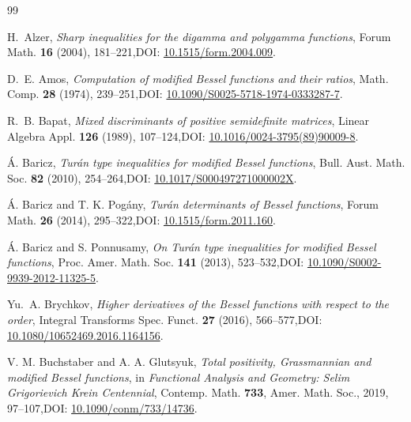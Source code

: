 \documentclass[11pt,a4paper]{amsart}
\numberwithin{equation}{section}
\theoremstyle{plain}
\theoremstyle{definition}
\begin{document}
\begin{thebibliography}{99}

H.~Alzer,
\emph{Sharp inequalities for the digamma and polygamma functions},
Forum Math. \textbf{16} (2004), 181--221,\newline DOI: \href{https://doi.org/10.1515/form.2004.009}{10.1515/form.2004.009}.

D.~E. Amos,
\emph{Computation of modified Bessel functions and their ratios},
Math. Comp. \textbf{28} (1974), 239--251,\newline DOI: \href{https://doi.org/10.1090/S0025-5718-1974-0333287-7}{10.1090/S0025-5718-1974-0333287-7}.


R.~B. Bapat,
\emph{Mixed discriminants of positive semidefinite matrices},
Linear Algebra Appl. \textbf{126} (1989), 107--124,\newline DOI: \href{https://doi.org/10.1016/0024-3795(89)90009-8}{10.1016/0024-3795(89)90009-8}.

\'{A}. Baricz,
\emph{Tur\'{a}n type inequalities for modified Bessel functions},
Bull. Aust. Math. Soc. \textbf{82} (2010), 254--264,\newline DOI: \href{https://doi.org/10.1017/S000497271000002X}{10.1017/S000497271000002X}.

\'{A}. Baricz and T. K. Pog\'{a}ny,
\emph{Tur\'{a}n determinants of Bessel functions},
Forum Math. \textbf{26} (2014), 295--322,\newline DOI: \href{https://doi.org/10.1515/form.2011.160}{10.1515/form.2011.160}.

\'{A}. Baricz and S. Ponnusamy,
\emph{On Tur\'{a}n type inequalities for modified Bessel functions},
Proc. Amer. Math. Soc. \textbf{141} (2013), 523--532,\newline DOI: \href{https://doi.org/10.1090/S0002-9939-2012-11325-5}{10.1090/S0002-9939-2012-11325-5}.

Yu.~A. Brychkov,
\emph{Higher derivatives of the Bessel functions with respect to the order},
Integral Transforms Spec. Funct. \textbf{27} (2016), 566--577,\newline DOI: \href{https://doi.org/10.1080/10652469.2016.1164156}{10.1080/10652469.2016.1164156}.

V. M. Buchstaber and A. A. Glutsyuk,
\emph{Total positivity, Grassmannian and modified Bessel functions},
in \emph{Functional Analysis and Geometry: Selim Grigorievich Krein Centennial},
Contemp. Math. \textbf{733}, Amer. Math. Soc., 2019, 97--107,\newline DOI: \href{https://doi.org/10.1090/conm/733/14736}{10.1090/conm/733/14736}.


\end{thebibliography}
\end{document}
